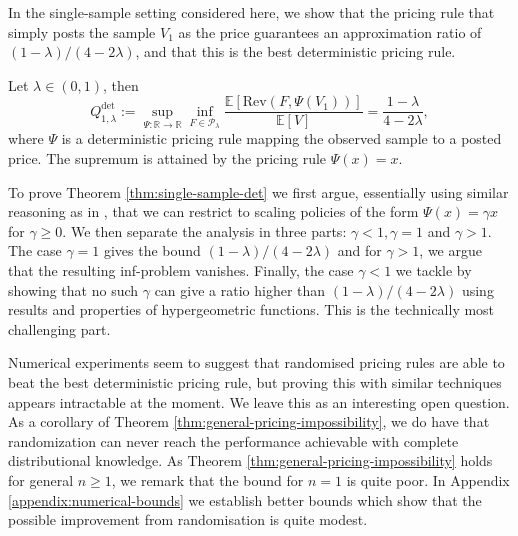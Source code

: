 \documentclass[11pt]{article}
\newcommand{\E}{\mathbb{E}}
\newcommand{\Rev}{\mathrm{Rev}}
\begin{document}
In the single-sample setting considered here, we show that the pricing rule that simply posts the sample $V_1$ as the price guarantees an approximation ratio of $(1-\lambda)/(4-2\lambda)$, and that this is the best deterministic pricing rule.
\begin{theorem} 
    \label{thm:single-sample-det}
	Let $\lambda\in(0,1)$, then
	$$
	   Q^{\mathrm{det}}_{1,\lambda}:=\sup_{\Psi:\mathbb{R}\to\mathbb{R}}\inf_{F\in\mathcal{P}_\lambda}\frac{\E[\Rev(F,\Psi(V_1))]}{\E[V]}=\frac{1-\lambda}{4-2\lambda},
    $$
    where $\Psi$ is a deterministic pricing rule mapping the observed sample to a posted price.
    The supremum is attained by the pricing rule $\Psi(x)=x$.
\end{theorem}
To prove Theorem \ref{thm:single-sample-det} we first argue, essentially using similar reasoning as in \cite[Proposition 1]{allouah2022pricing}, that we can restrict to scaling policies of the form $\Psi(x)=\gamma x$ for $\gamma \geq 0$. 
We then separate the analysis in three parts: $\gamma < 1, \gamma = 1$ and $\gamma > 1$. The case $\gamma = 1$ gives the bound $(1-\lambda)/(4-2\lambda)$ and for $\gamma > 1$, we argue that the resulting inf-problem vanishes. 
Finally, the case $\gamma < 1$ we tackle by showing that no such $\gamma$ can give a ratio higher than $(1-\lambda)/(4-2\lambda)$ using results and properties of hypergeometric functions. This is the technically most challenging part.

Numerical experiments seem to suggest that randomised pricing rules are able to beat the best deterministic pricing rule, but proving this with similar techniques appears intractable at the moment. We leave this as an interesting open question.
As a corollary of Theorem \ref{thm:general-pricing-impossibility}, we do have that randomization can never reach the performance achievable with complete distributional knowledge. 
As Theorem \ref{thm:general-pricing-impossibility} holds for general $n \geq 1$, we remark that the bound for $n=1$ is quite poor.
In Appendix \ref{appendix:numerical-bounds} we establish better bounds which show that the possible improvement from randomisation is quite modest.
\end{document}
